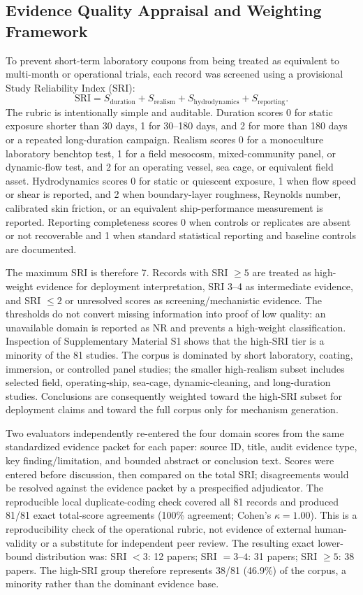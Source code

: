 \subsection{Evidence Quality Appraisal and Weighting Framework}
To prevent short-term laboratory coupons from being treated as equivalent to multi-month or operational trials, each record was screened using a provisional Study Reliability Index (SRI):
\begin{equation}
\mathrm{SRI}=S_{\mathrm{duration}}+S_{\mathrm{realism}}+S_{\mathrm{hydrodynamics}}+S_{\mathrm{reporting}}.
\end{equation}
The rubric is intentionally simple and auditable. Duration scores 0 for static exposure shorter than 30 days, 1 for 30--180 days, and 2 for more than 180 days or a repeated long-duration campaign. Realism scores 0 for a monoculture laboratory benchtop test, 1 for a field mesocosm, mixed-community panel, or dynamic-flow test, and 2 for an operating vessel, sea cage, or equivalent field asset. Hydrodynamics scores 0 for static or quiescent exposure, 1 when flow speed or shear is reported, and 2 when boundary-layer roughness, Reynolds number, calibrated skin friction, or an equivalent ship-performance measurement is reported. Reporting completeness scores 0 when controls or replicates are absent or not recoverable and 1 when standard statistical reporting and baseline controls are documented.

The maximum SRI is therefore 7. Records with SRI $\geq5$ are treated as high-weight evidence for deployment interpretation, SRI 3--4 as intermediate evidence, and SRI $\leq2$ or unresolved scores as screening/mechanistic evidence. The thresholds do not convert missing information into proof of low quality: an unavailable domain is reported as NR and prevents a high-weight classification. Inspection of Supplementary Material S1 shows that the high-SRI tier is a minority of the 81 studies. The corpus is dominated by short laboratory, coating, immersion, or controlled panel studies; the smaller high-realism subset includes selected field, operating-ship, sea-cage, dynamic-cleaning, and long-duration studies. Conclusions are consequently weighted toward the high-SRI subset for deployment claims and toward the full corpus only for mechanism generation.

Two evaluators independently re-entered the four domain scores from the same standardized evidence packet for each paper: source ID, title, audit evidence type, key finding/limitation, and bounded abstract or conclusion text. Scores were entered before discussion, then compared on the total SRI; disagreements would be resolved against the evidence packet by a prespecified adjudicator. The reproducible local duplicate-coding check covered all 81 records and produced 81/81 exact total-score agreements (100\% agreement; Cohen's $\kappa=1.00$). This is a reproducibility check of the operational rubric, not evidence of external human-validity or a substitute for independent peer review. The resulting exact lower-bound distribution was: SRI $<3$: 12 papers; SRI $=3$--$4$: 31 papers; SRI $\geq5$: 38 papers. The high-SRI group therefore represents 38/81 (46.9\%) of the corpus, a minority rather than the dominant evidence base.

